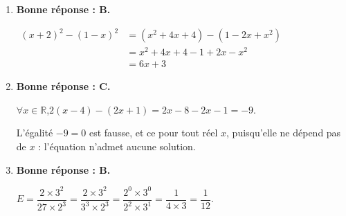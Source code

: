 \documentclass[10pt]{article}
\providecommand{\R}{\mathbb{R}}
\begin{document}
\begin{enumerate}
		La droite passe par les points $(0 ; 30)$ et $(3 ; 0)$.

		L'ordonnée à l'origine est donc : \quad $30$.

		Le coefficient directeur est donné par :\quad $\dfrac{0-30}{3-0}=-10$.

		Donc la fonction représentée a bien pour expression :\quad $f(x)=-10x+30$.

		\item \textbf{Bonne réponse : B.}

		 $\begin{aligned}
		 	(x+2)^{2}-(1-x)^{2}&=\left(x^{2}+4x+4\right)-\left(1-2x+x^{2}\right)\\
		 	&=x^{2}+4x+4-1+2x-x^{2}\\
		 	&=6x+3
		 \end{aligned}$

		\item \textbf{Bonne réponse : C.}

		$\forall x \in \R$,\quad $2(x-4)-(2x+1)=2x-8-2x-1=-9$.

		L'égalité \quad $-9=0$ \quad est fausse, et ce pour tout réel $x$, puisqu'elle ne dépend pas de $x$ : l'équation n'admet aucune solution.

		\item \textbf{Bonne réponse : B.}

		$E=\dfrac{2\times 3^{2}}{27\times 2^{3}}
		=\dfrac{2\times 3^2}{3^3\times 2^3}
		=\dfrac{2^0 \times 3^0}{2^2 \times 3^1}
		=\dfrac{1}{4\times 3}
		=\dfrac{1}{12}$.
	\end{enumerate}
\end{document}
